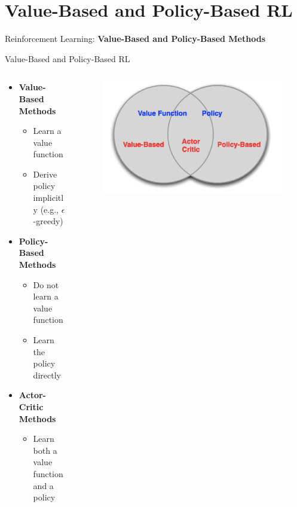 \section{Value-Based and Policy-Based RL}
\begin{frame}{}
    \LARGE Reinforcement Learning: \textbf{Value-Based and Policy-Based Methods}
\end{frame}

\begin{frame}{Value-Based and Policy-Based RL}
\begin{columns}
\begin{column}{0.5\textwidth}
   \begin{itemize}
       \item \textbf{Value-Based Methods}
       \begin{itemize}
            \item Learn a value function
            \item Derive policy implicitly (e.g., $\epsilon$-greedy)
       \end{itemize}
       \item \textbf{Policy-Based Methods}
       \begin{itemize}
            \item Do not learn a value function
            \item Learn the policy directly
       \end{itemize}
       \item \textbf{Actor-Critic Methods}
       \begin{itemize}
            \item Learn both a value function and a policy
       \end{itemize}
   \end{itemize}
\end{column}
\begin{column}{0.5\textwidth}
    \begin{figure}
    \centering
    \includegraphics[width=1.0\textwidth,height=1.0\textheight,keepaspectratio]{images/policygrad+reinforce+actor/a2c_2.png}
    \end{figure}
\end{column}
\end{columns}
\end{frame}


